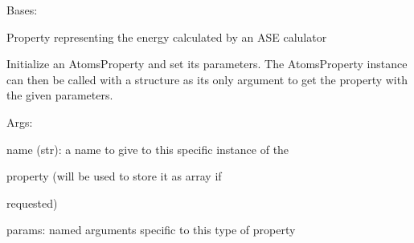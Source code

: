 \documentclass[letterpaper,10pt,english]{sphinxmanual}
\begin{document}
\begin{fulllineitems}
\label{doctree/soprano.properties.basic.basic:soprano.properties.basic.basic.CalcEnergy}
Bases: {\hyperref[doctree/soprano.properties.atomsproperty:soprano.properties.atomsproperty.AtomsProperty]{\emph{}}}

Property representing the energy calculated by an ASE calulator

Initialize an AtomsProperty and set its parameters.
The AtomsProperty instance can then be called with a structure as its
only argument to get the property with the given parameters.

\begin{DUlineblock}{0em}
\item[] Args:
\item[]
\begin{DUlineblock}{\DUlineblockindent}
\item[] name (str): a name to give to this specific instance of the
\item[]
\begin{DUlineblock}{\DUlineblockindent}
\item[] property (will be used to store it as array if
\item[] requested)
\end{DUlineblock}
\item[] params: named arguments specific to this type of property
\end{DUlineblock}
\end{DUlineblock}

\begin{fulllineitems}
\label{doctree/soprano.properties.basic.basic:soprano.properties.basic.basic.CalcEnergy.default_name}
\end{fulllineitems}


\begin{fulllineitems}
\label{doctree/soprano.properties.basic.basic:soprano.properties.basic.basic.CalcEnergy.default_params}
\end{fulllineitems}


\begin{fulllineitems}
\label{doctree/soprano.properties.basic.basic:soprano.properties.basic.basic.CalcEnergy.extract}
\end{fulllineitems}


\end{fulllineitems}
\end{document}
